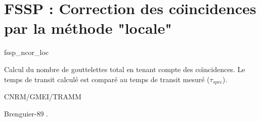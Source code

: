 %
\section{FSSP : Correction des co\"{\i}ncidences par
la m\'ethode "locale" }

 {\sf fssp\_ncor\_loc}

Calcul du nombre de gouttelettes total en tenant compte
des co\"{\i}ncidences. Le temps de transit calcul\'e 
est compar\'e au temps de transit mesur\'e ($\tau_{spec}$).


\bigskip





CNRM/GMEI/TRAMM

Brenguier-89 \cite{Brenguier-89}.
